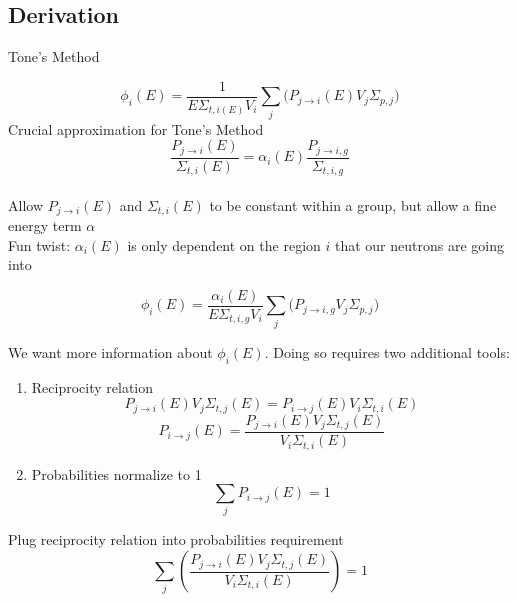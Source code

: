 \documentclass{beamer}
\begin{document}
\subsection{Derivation}
  \begin{frame}{Tone's Method}

    \begin{equation*}\phi_{i}(E)=\frac{1}{E\Sigma_{t,i(E)}V_i}\sum\limits_j\Big(P_{j\rightarrow i}(E)V_{j}\Sigma_{p,j}\Big)\end{equation*}
  Crucial approximation for Tone's Method
    \begin{equation*}\frac{P_{j\rightarrow i}(E)}{\Sigma_{t,i}(E)}=\alpha_{i}(E)\frac{P_{j\rightarrow i,g}}{\Sigma_{t,i,g}}\end{equation*}\\[4pt]
      Allow $P_{j\rightarrow i}(E)$ and $\Sigma_{t,i}(E)$ to be constant within a group, but allow a fine energy term $\alpha$\\[4pt]
    Fun twist: $\alpha_i(E)$ is only dependent on the region $i$ that our neutrons are going into

  \end{frame}
    \begin{frame}
      \begin{equation*}\phi_{i}(E)=\frac{\alpha_i(E)}{E\Sigma_{t,i,g}V_i}\sum\limits_j\Big(P_{j\rightarrow i,g}V_{j}\Sigma_{p,j}\Big)\end{equation*}

  We want more information about $\phi_i(E)$. Doing so requires two additional tools:
  \begin{enumerate}
    \item Reciprocity relation
      \begin{equation*}P_{j\rightarrow i}(E)V_{j}\Sigma_{t,j}(E)=P_{i\rightarrow j}(E)V_{i}\Sigma_{t,i}(E)\end{equation*}
        \begin{equation*}P_{i\rightarrow j}(E)=\frac{P_{j\rightarrow i}(E)V_{j}\Sigma_{t,j}(E)}{V_{i}\Sigma_{t,i}(E)}\end{equation*}
    \item Probabilities normalize to 1
      \begin{equation*}\sum\limits_{j}P_{i\rightarrow j}(E)=1\end{equation*}
  \end{enumerate}


Plug reciprocity relation into probabilities requirement
      \begin{equation*}\sum\limits_{j}\left(\frac{P_{j\rightarrow i}(E)V_{j}\Sigma_{t,j}(E)}{V_{i}\Sigma_{t,i}(E)}\right)=1\end{equation*}

    \end{frame}
\end{document}
